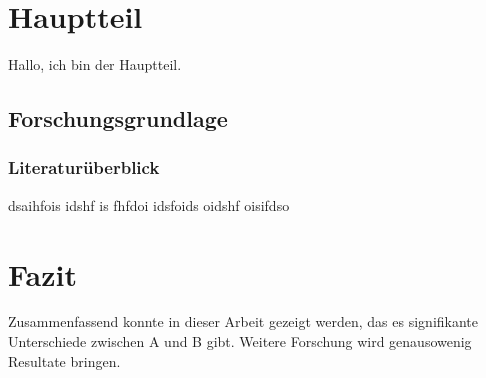 \documentclass[ngerman]{scrartcl}
\begin{document}
\section{Hauptteil}

Hallo, ich bin der Hauptteil.

\subsection{Forschungsgrundlage}

\subsubsection{Literaturüberblick}

dsaihfois idshf is fhfdoi idsfoids oidshf oisifdso


\section{Fazit}

Zusammenfassend konnte in dieser Arbeit gezeigt werden, das es signifikante Unterschiede zwischen A und B gibt. Weitere Forschung wird genausowenig Resultate bringen.
\end{document}

